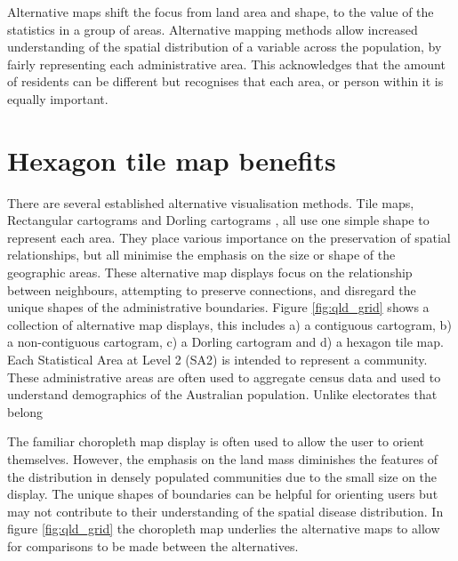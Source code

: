 \documentclass{monashthesis}
\begin{document}
Alternative maps shift the focus from land area and shape, to the value of the statistics in a group of areas.
Alternative mapping methods allow increased understanding of the spatial distribution of a variable across the population, by fairly representing each administrative area. This acknowledges that the amount of residents can be different but recognises that each area, or person within it is equally important.

\hypertarget{hexagon-tile-map-benefits}{%
\section{Hexagon tile map benefits}\label{hexagon-tile-map-benefits}}

There are several established alternative visualisation methods.
Tile maps, Rectangular cartograms \autocite{ORC} and Dorling cartograms \autocite{ACTUC}, all use one simple shape to represent each area. They place various importance on the preservation of spatial relationships, but all minimise the emphasis on the size or shape of the geographic areas. These alternative map displays focus on the relationship between neighbours, attempting to preserve connections, and disregard the unique shapes of the administrative boundaries. Figure \ref{fig:qld_grid} shows a collection of alternative map displays, this includes a) a contiguous cartogram, b) a non-contiguous cartogram, c) a Dorling cartogram and d) a hexagon tile map.
Each Statistical Area at Level 2 (SA2) is intended to represent a community. These administrative areas are often used to aggregate census data and used to understand demographics of the Australian population. Unlike electorates that belong

The familiar choropleth map display is often used to allow the user to orient themselves. However, the emphasis on the land mass diminishes the features of the distribution in densely populated communities due to the small size on the display.
The unique shapes of boundaries can be helpful for orienting users but may not contribute to their understanding of the spatial disease distribution. In figure \ref{fig:qld_grid} the choropleth map underlies the alternative maps to allow for comparisons to be made between the alternatives.
\end{document}
